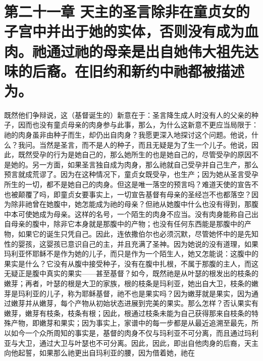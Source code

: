 
\section{第二十一章 天主的圣言除非在童贞女的子宫中并出于她的实体，否则没有成为血肉。祂通过祂的母亲是出自她伟大祖先达味的后裔。在旧约和新约中祂都被描述为。}

既然他们争辩说，这（基督诞生的）新意在于：圣言降生成人时没有人的父亲的种子，因而也没有童贞母亲的肉身参与此事，那么，为什么这新意不更应当局限于：祂的肉身虽非由种子而生，却仍出自肉身？我愿更深入地探讨这个问题。他说，什么？我问。当然是圣言，而不是人的种子，而且无疑是为了生一个儿子。他说，因此，既然受孕的行为是她自己的，那么她所生的也是她自己的，尽管受孕的原因不是她的。另一方面，如果圣言独自成为肉身，那么祂就自己受孕并自己生产，那么预言就成荒谬了。因为在这种情况下，童贞女既受孕，也生产；因为她从圣言受孕所生的一切，都不是她自己的肉身。但这是唯一落空的预言吗？难道天使的宣告不也被颠覆了吗，即童贞女要事实上，一切宣告基督有母亲的圣经岂不也都落空？因为除非祂曾在她腹中，她怎能成为祂的母亲？但祂从她腹中什么也没有得到，那腹中本可使她成为母亲。这样的名号，一个陌生的肉身不应当。没有肉身能称自己出自母亲的腹中，除非它本身就是那腹中的产物；也没有任何东西能是那腹中的产物，如果它的诞生只凭自己。因此，连依撒伯尔也必须沉默，尽管她怀中的是先知性的婴孩，这婴孩已意识自己的主，并且充满了圣神。因为她说的没有道理，如果玛利亚怀耶稣不是作为她的儿子，而只是作为一个陌生人，她又怎能说：这腹中的果实是什么？它没有从腹中接受种子，没有在腹中扎根，不属于那腹的主人，而这无疑正是腹中真实的果实——甚至基督？如今，既然祂是从叶瑟的根发出的枝条的嫩芽；再者，叶瑟的根是大卫的家族，根的枝条是玛利亚，她出自大卫，枝条的嫩芽是玛利亚的儿子，称为耶稣基督，祂不也是果实吗？因为嫩芽就是果实，因为通过嫩芽并从嫩芽，每个产物从初始状态进展到完美的果实。那么怎样？否认果实有嫩芽，嫩芽有枝条，枝条有根；因此，根通过枝条未能为自己获得那来自枝条的特殊产物，即嫩芽和果实；因为事实上，家谱中的每一步都是从最近追溯至最先，所以如今一个众所周知的事实是，基督的肉身不仅与玛利亚不可分离，而且通过玛利亚与大卫，通过大卫与叶瑟也不可分离。因此，因此，即出自他肉身的后裔，天主向他起誓，如果那么祂更出自玛利亚的腰，因为借着她，祂在\par

